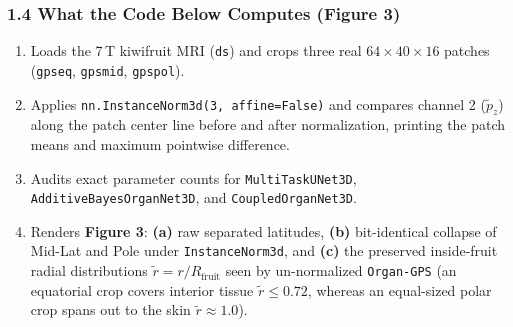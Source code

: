 \documentclass[10pt,a4paper]{article}
\renewcommand{\_}{\origunderscore\allowbreak}
\begin{document}
\subsubsection*{1.4 What the Code Below Computes (Figure 3)}
\begin{enumerate}
\item Loads the 7\,T kiwifruit MRI (\texttt{ds}) and crops three real $64 \times 40 \times 16$ patches (\texttt{gps\_eq}, \texttt{gps\_mid}, \texttt{gps\_pol}).
\item Applies \texttt{nn.InstanceNorm3d(3, affine=False)} and compares channel 2 ($\tilde{p}_z$) along the patch center line before and after normalization, printing the patch means and maximum pointwise difference.
\item Audits exact parameter counts for \texttt{MultiTaskUNet3D}, \texttt{AdditiveBayesOrganNet3D}, and \texttt{CoupledOrganNet3D}.
\item Renders \textbf{Figure 3}: \textbf{(a)} raw separated latitudes, \textbf{(b)} bit-identical collapse of Mid-Lat and Pole under \texttt{InstanceNorm3d}, and \textbf{(c)} the preserved inside-fruit radial distributions $\tilde{r} = r / R_{\text{fruit}}$ seen by un-normalized \texttt{Organ-GPS} (an equatorial crop covers interior tissue $\tilde{r} \le 0.72$, whereas an equal-sized polar crop spans out to the skin $\tilde{r} \approx 1.0$).
\end{enumerate}
\end{document}
